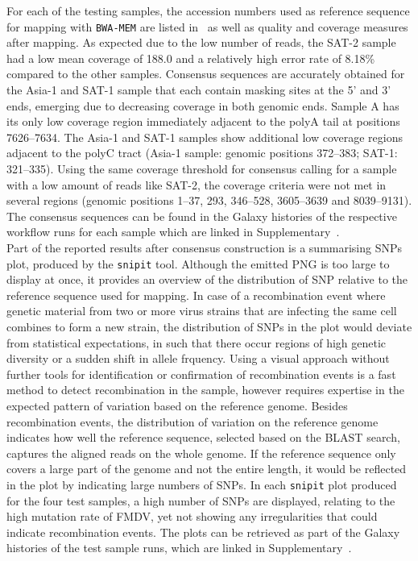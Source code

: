 For each of the testing samples, the accession numbers used as reference sequence for mapping with \texttt{BWA-MEM} are listed in~ as well as quality and coverage measures after mapping. As expected due to the low number of reads, the SAT-2 sample had a low mean coverage of {188.0\texttimes } and a relatively high error rate of 8.18\% compared to the other samples. Consensus sequences are accurately obtained for the Asia-1 and SAT-1 sample that each contain masking sites at the 5' and 3' ends, emerging due to decreasing coverage in both genomic ends. Sample A has its only low coverage region immediately adjacent to the polyA tail at positions 7626--7634. The Asia-1 and SAT-1 samples show additional low coverage regions adjacent to the polyC tract (Asia-1 sample: genomic positions 372--383; SAT-1: 321--335). Using the same coverage threshold for consensus calling for a sample with a low amount of reads like SAT-2, the coverage criteria were not met in several regions (genomic positions 1--37, 293, 346--528, 3605--3639 and 8039--9131). The consensus sequences can be found in the Galaxy histories of the respective workflow runs for each sample which are linked in Supplementary~. \\
Part of the reported results after consensus construction is a summarising \acp{SNP} plot, produced by the \texttt{snipit} tool. Although the emitted PNG is too large to display at once, it provides an overview of the distribution of \acs{SNP} relative to the reference sequence used for mapping. In case of a recombination event where genetic material from two or more virus strains that are infecting the same cell combines to form a new strain, the distribution of \acp{SNP} in the plot would deviate from statistical expectations, in such that there occur regions of high genetic diversity or a sudden shift in allele frquency. Using a visual approach without further tools for identification or confirmation of recombination events is a fast method to detect recombination in the sample, however requires expertise in the expected pattern of variation based on the reference genome. Besides recombination events, the distribution of variation on the reference genome indicates how well the reference sequence, selected based on the \ac{BLAST} search, captures the aligned reads on the whole genome. If the reference sequence only covers a large part of the genome and not the entire length, it would be reflected in the plot by indicating large numbers of \acp{SNP}. In each \texttt{snipit} plot produced for the four test samples, a high number of \acp{SNP} are displayed, relating to the high mutation rate of \ac{FMDV}, yet not showing any irregularities that could indicate recombination events. The plots can be retrieved as part of the Galaxy histories of the test sample runs, which are linked in Supplementary~.

